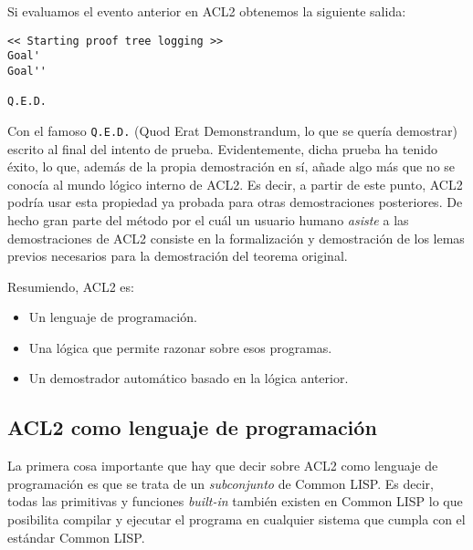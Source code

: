 \documentclass[a4paper,10pt]{article}
\begin{document}
\par\vspace{10pt}

Si evaluamos el evento anterior en ACL2 obtenemos la siguiente salida:

\par\vspace{10pt}

\begin{lstlisting}[language=salidaverde]
<< Starting proof tree logging >>
Goal'
Goal''

Q.E.D.
\end{lstlisting}

\par\vspace{10pt}

Con el famoso \texttt{Q.E.D.} (Quod Erat Demonstrandum, lo que se quería demostrar) escrito al final del intento de prueba. Evidentemente, dicha prueba ha tenido éxito, lo que, además de la propia demostración en sí, añade algo más que no se conocía al mundo lógico interno de ACL2. Es decir, a partir de este punto, ACL2 podría usar esta propiedad ya probada para otras demostraciones posteriores. De hecho gran parte del método por el cuál un usuario humano \emph{asiste} a las demostraciones de ACL2 consiste en la formalización y demostración de los lemas previos necesarios para la demostración del teorema original.

\par\vspace{10pt}

Resumiendo, ACL2 es:

\par\vspace{10pt}

\begin{itemize}
	\item Un lenguaje de programación.
	\item Una lógica que permite razonar sobre esos programas.
	\item Un demostrador automático basado en la lógica anterior.
\end{itemize}

\vspace{12pt}
\subsection{ACL2 como lenguaje de programación}
\vspace{10pt}

La primera cosa importante que hay que decir sobre ACL2 como lenguaje de programación es que se trata de un \emph{subconjunto} de Common LISP. Es decir, todas las primitivas y funciones \emph{built-in} también existen en Common LISP lo que posibilita compilar y ejecutar el programa en cualquier sistema que cumpla con el estándar Common LISP.
\end{document}

